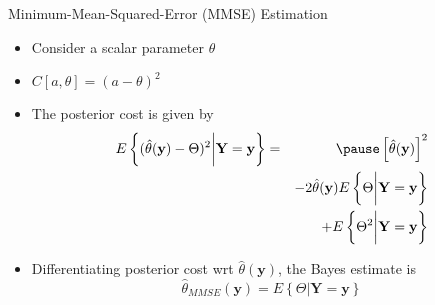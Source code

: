 \documentclass[t]{beamer}
\begin{document}
\begin{frame}{Minimum-Mean-Squared-Error (MMSE) Estimation}
  \footnotesize
  \begin{itemize}
    \item \pause Consider a scalar parameter $\theta$
    \item \pause $C[a,\theta] = (a-\theta)^2$
    \item \pause The posterior cost is given by
      \begin{eqnarray*}
        E\left\{ (\hat{\theta}(\mathbf{y}) - \Theta)^2 \bigg| \mathbf{Y} = \mathbf{y}\right\} & = & \pause \left[ \hat{\theta}(\mathbf{y})\right]^2 \\
                                                                                     &   & - 2\hat{\theta}(\mathbf{y}) E\left\{ \Theta \bigg| \mathbf{Y} = \mathbf{y}\right\} \\
                                                                                     &   & + E \left\{ \Theta^2 \bigg| \mathbf{Y} = \mathbf{y}\right\}
      \end{eqnarray*}
    \item \pause Differentiating posterior cost wrt $\hat{\theta}(\mathbf{y})$, the Bayes estimate is  \pause
      \begin{equation*}
        \hat{\theta}_{MMSE}(\mathbf{y}) = E\left\{ \Theta \bigg| \mathbf{Y} = \mathbf{y} \right\}
      \end{equation*}
  \end{itemize}
  \normalsize
\end{frame}
\end{document}
